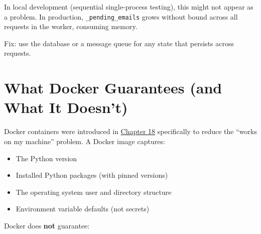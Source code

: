 \begin{codebox}[short]

\begin{Shaded}
\begin{Highlighting}[]
\OperatorTok{=}\NormalTok{ []}

\NormalTok{(}\OperatorTok{=}\NormalTok{[}\NormalTok{])}
\OperatorTok{=}\NormalTok{ request.json[}\NormalTok{]}
\CommentTok{\# }
     \NormalTok{, }
\end{Highlighting}
\end{Shaded}

\end{codebox}

\noindent{}In local development (sequential single-process testing), this might not appear as a problem. In production, \texttt{\_pending\_emails} grows without bound across all requests in the worker, consuming memory.

Fix: use the database or a message queue for any state that persists across requests.

\setcounter{section}{6}
\section{What Docker Guarantees (and What It Doesn't)}\label{39-local-vs-production:397-what-docker-guarantees-and-what-it-doesnt}

Docker containers were introduced in \hyperref[ch:18-containerization]{Chapter 18} specifically to reduce the ``works on my machine'' problem. A Docker image captures:

\begin{itemize}
\tightlist
\item
  The Python version
\item
  Installed Python packages (with pinned versions)
\item
  The operating system user and directory structure
\item
  Environment variable defaults (not secrets)
\end{itemize}

\noindent{}Docker does \textbf{not} guarantee:

